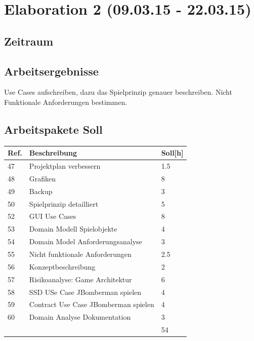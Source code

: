 \documentclass[11pt]{scrartcl}
\begin{document}
\section{Elaboration 2 (09.03.15 - 22.03.15)}
\subsection{Zeitraum}
\subsection{Arbeitsergebnisse}
Use Cases aufschreiben, dazu das Spielprinzip genauer beschreiben. 
Nicht Funktionale Anforderungen bestimmen.
\subsection{Arbeitspakete Soll}
  \begin{tabularx} {\linewidth}{lXl}
    \bf{Ref.}  & \bf{Beschreibung} & \bf{Soll[h]} \\
    \hline
    47 & Projektplan verbessern & 1.5 \\
    48 & Grafiken & 8 \\
    49 &  Backup & 3 \\
    50 & Spielprinzip detailliert & 5 \\
    52 &  GUI Use Cases & 8 \\
    53 & Domain Modell Spielobjekte & 4\\
    54 & Domain Model Anforderungsanalyse & 3\\
    55 & Nicht funktionale Anforderungen & 2.5 \\
    56 & Konzeptbeschreibung & 2 \\
    57 & Risikoanalyse: Game Architektur  & 6 \\
    58 & SSD USe Case JBomberman spielen & 4 \\
    59 & Contract Use Case JBomberman spielen & 4\\
    60 & 	Domain Analyse Dokumentation & 3 \\
    \hline
    & & 54
  \end{tabularx}
  
\end{document}
